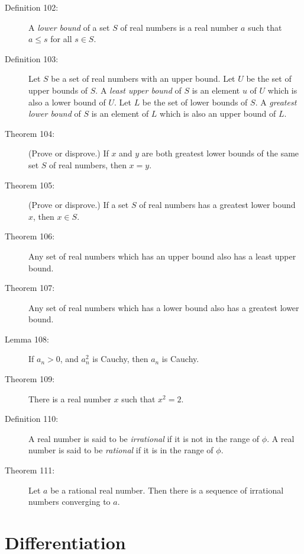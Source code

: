\documentclass{article}
\begin{document}
\begin{description}
  \item[Definition 102:] A \emph{lower bound} of a set $S$ of real numbers is a real number $a$ such that $a \leq s$ for all $s \in S$.

  \item[Definition 103:] Let $S$ be a set of real numbers with an upper bound. Let $U$ be the set of upper bounds of $S$. A \emph{least upper bound} of $S$ is an element $u$ of $U$ which is also a lower bound of $U$. Let $L$ be the set of lower bounds of $S$. A \emph{greatest lower bound} of $S$ is an element of $L$ which is also an upper bound of $L$.

  \item[Theorem 104:] (Prove or disprove.) If $x$ and $y$ are both greatest lower bounds of the same set $S$ of real numbers, then $x = y$.

  \item[Theorem 105:] (Prove or disprove.) If a set $S$ of real numbers has a greatest lower bound $x$, then $x \in S$. 

  \item[Theorem 106:] Any set of real numbers which has an upper bound also has a least upper bound.

  \item[Theorem 107:] Any set of real numbers which has a lower bound also has a greatest lower bound. 

  \item[Lemma 108:] If $a_{n} > 0$, and $a_{n}^{2}$ is Cauchy, then $a_{n}$ is Cauchy.

  \item[Theorem 109:] There is a real number $x$ such that $x^{2} = 2$.

  \item[Definition 110:] A real number is said to be \emph{irrational} if it is not in the range of $\phi$. A real number is said to be \emph{rational} if it is in the range of $\phi$.

  \item[Theorem 111:] Let $a$ be a rational real number. Then there is a sequence of irrational numbers converging to $a$. 

\end{description}



\newpage

\section{Differentiation}
\end{document}
